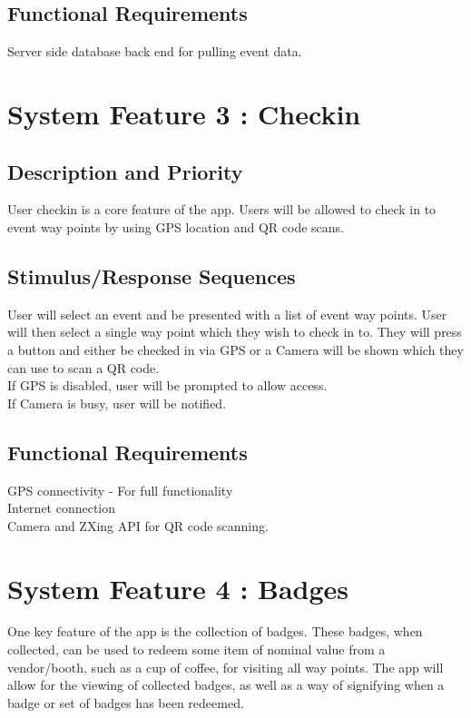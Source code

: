 \documentclass{scrreprt}
\begin{document}
\subsection{Functional Requirements}
Server side database back end for pulling event data.

\section{System Feature 3 : Checkin}

\subsection{Description and Priority}
User checkin is a core feature of the app. Users will be allowed to check in to event way points by using GPS location and QR code scans.

\subsection{Stimulus/Response Sequences}
User will select an event and be presented with a list of event way points. User will then
select a single way point which they wish to check in to. They will press a button and either
be checked in via GPS or a Camera will be shown which they can use to scan a QR code. \\
If GPS is disabled, user will be prompted to allow access. \\
If Camera is busy, user will be notified.

\subsection{Functional Requirements}
GPS connectivity - For full functionality\\
Internet connection \\
Camera and ZXing API for QR code scanning.

\section{System Feature 4 : Badges}
One key feature of the app is the collection of badges. These badges, when collected,
can be used to redeem some item of nominal value from a vendor/booth, such as a
cup of coffee, for visiting all way points. The app will allow for the viewing of collected
badges, as well as a way of signifying when a badge or set of badges has been redeemed.
\end{document}
